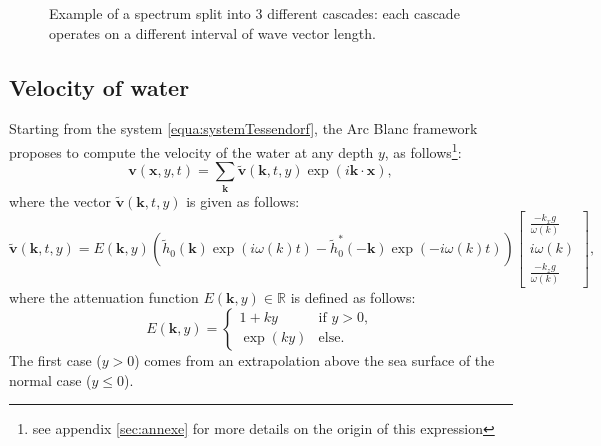 \documentclass[final]{jcgt}
\def\framework{the Arc Blanc framework\xspace}
\begin{document}
\begin{figure}
	\centering
	
	\caption{Example of a spectrum split into $3$ different cascades: each cascade operates on a different interval of wave vector length.}
	\label{fig:cascades}
\end{figure}


\subsection{Velocity of water}
\label{subsec:velWater}
Starting from the system \ref{equa:systemTessendorf}, \framework proposes to compute the velocity of the water at any depth $y$, as follows\footnote{see appendix \ref{sec:annexe} for more details on the origin of this expression}:
\begin{equation}\label{equa:velocity}
	\mathbf v(\mathbf x,y,t)=
	\sum_{\mathbf{k}} \tilde{\mathbf{v}}(\mathbf{k},t,y)\exp\left(i\mathbf{k}\cdot\mathbf x\right),
\end{equation}
where the vector $\tilde{\mathbf{v}}(\mathbf{k},t, y)$ is given as follows:
\begin{equation}
	\tilde{\mathbf{v}}\left(\mathbf{k},t,y\right)=%
	E\left(\mathbf{k},y\right)\left(\tilde{h}_0\left(\mathbf{k}\right)\exp\left({i\omega(k)t}\right)-\tilde{h}_0^*\left(-\mathbf{k}\right)\exp\left({-i\omega(k)t}\right)\right)
	\left[
		\begin{array}{c}
			\displaystyle\frac{-k_xg}{\omega(k)} \\
			\displaystyle i\omega(k)             \\
			\displaystyle\frac{-k_zg}{\omega(k)}
		\end{array}
		\right],
\end{equation}
where the attenuation function $E(\mathbf{k},y)\in\mathbb R$ is defined as follows:
\begin{equation}
	\label{equa:attenuationDeep}
	E(\mathbf{k}, y)=
	\begin{cases}
		1+ky     & \text{if }y>0, \\
		\exp(ky) & \text{else}.
	\end{cases}
\end{equation}
The first case ($y>0$) comes from an extrapolation above the sea surface of the normal case ($y\leq0$).
\end{document}
